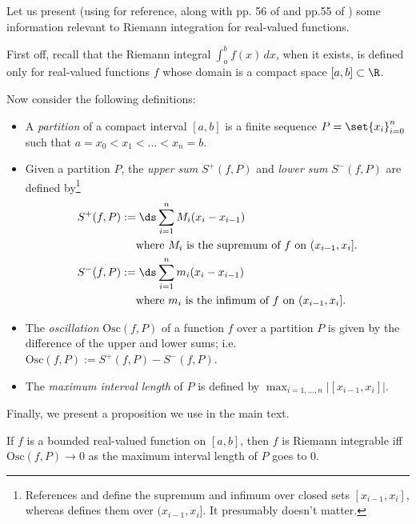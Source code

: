 \documentclass{article} %
\begin{document}
Let us present (using  \cite{strichartz2000way} for reference, along with pp. 56 of \cite{folland1999real} and pp.55 of \cite{ash2000probability}) some information relevant to Riemann integration for real-valued functions.  

First off, recall that the Riemann integral $\int_{a}^b f(x) \, dx$, when it exists,  is defined only for real-valued functions  $f$ whose domain is a compact space $[a,b] \subset \R$.   

Now consider the following definitions:

\begin{itemize}
\item A \textit{partition} of a compact interval $[a,b]$ is a finite sequence $P=\set{x_i}_{i=0}^n$ such that $a=x_0 < x_1 < ... < x_n = b$. 
\item Given a partition $P$, the \textit{upper sum} $S^+(f,P)$ and \textit{lower sum} $S^-(f,P)$ are defined by\footnote{References \cite{strichartz2000way} and \cite{folland1999real} define the supremum and infimum over closed sets $[x_{i-1}, x_i]$, whereas \cite{ash2000probability} defines them over $(x_{i-1},x_i]$.  It presumably doesn't matter.}
\begin{align*}
S^+(f,P) &:= \ds\sum_{i=1}^n M_i (x_i - x_{i-1}) \\
&\quad \text{ where $M_i$ is the supremum of $f$ on $(x_{i-1}, x_i]$.} \\	
S^-(f,P) &:= \ds\sum_{i=1}^n m_i (x_i - x_{i-1}) \\
&\quad \text{ where $m_i$ is the infimum of $f$ on $(x_{i-1}, x_i]$.} \\
\end{align*}
\item The \textit{oscillation} $\text{Osc}(f,P)$ of a function $f$ over a partition $P$ is given by the difference of the upper and lower sums; i.e. $ \text{Osc}(f,P) := S^+(f,P) - S^-(f,P)$.
\item The \textit{maximum interval length} of $P$ is defined by $ \max_{i=1,...,n} \big|[x_{i-1}, x_i]\big|$.
\end{itemize}

Finally, we present a proposition we use in the main text. 

\begin{proposition}
If $f$ is a bounded real-valued function on $[a,b]$, then $f$ is Riemann integrable iff $\text{Osc}(f,P) \to 0$ as the maximum interval length of $P$ goes to 0.
\label{prop:Riemann_integrable_iff_oscillation_goes_to_zero_as_partition_gets_finer}
\end{proposition}
\end{document}

